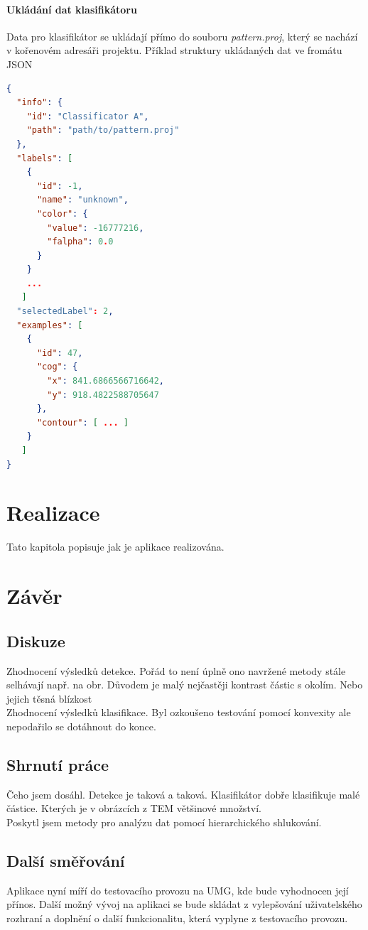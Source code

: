 \documentclass[11pt,twoside,a4paper,table]{book}
\begin{document}
\subsubsection{Ukládání dat klasifikátoru}
Data pro klasifikátor se ukládají přímo do souboru \textit{pattern.proj}, který se nachází v kořenovém adresáři projektu. Příklad struktury ukládaných dat ve fromátu JSON
\begin{lstlisting}[language=json,firstnumber=1]
{
  "info": {
    "id": "Classificator A",
    "path": "path/to/pattern.proj"
  },
  "labels": [
    {
      "id": -1,
      "name": "unknown",
      "color": {
        "value": -16777216,
        "falpha": 0.0
      }
    }
    ...
   ]
  "selectedLabel": 2,
  "examples": [
    {
      "id": 47,
      "cog": {
        "x": 841.6866566716642,
        "y": 918.4822588705647
      },
      "contour": [ ... ]
    }
   ]
}
\end{lstlisting}

\chapter{Realizace}
Tato kapitola popisuje jak je aplikace realizována.

\chapter{Závěr}
\section{Diskuze}
Zhodnocení výsledků detekce. Pořád to není úplně ono navržené metody stále selhávají např. na obr. Důvodem je malý nejčastěji kontrast částic s okolím. Nebo jejich těsná blízkost\\
Zhodnocení výsledků klasifikace. Byl ozkoušeno testování pomocí konvexity ale nepodařilo se dotáhnout do konce.

\section{Shrnutí práce}
Čeho jsem dosáhl.
Detekce je taková a taková.
Klasifikátor dobře klasifikuje malé částice. Kterých je v obrázcích z TEM většinové množství.\\
Poskytl jsem metody pro analýzu dat pomocí hierarchického shlukování.

\section{Další směřování}
Aplikace nyní míří do testovacího provozu na UMG, kde bude vyhodnocen její přínos. Další možný vývoj na aplikaci se bude skládat z vylepšování uživatelského rozhraní a doplnění o další funkcionalitu, která vyplyne z testovacího provozu.
\end{document}
